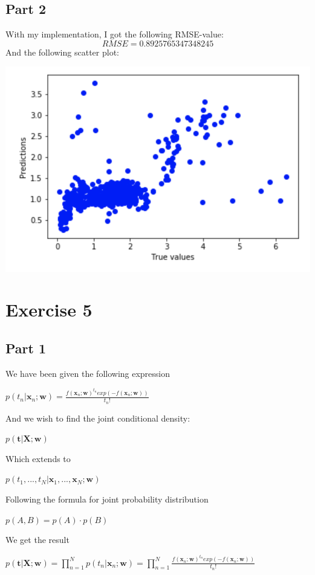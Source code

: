 \documentclass{report}
\begin{document}
\subsection*{Part 2}
With my implementation, I got the following RMSE-value:
$$RMSE = 0.8925765347348245$$
And the following scatter plot:
\begin{center}
    \includegraphics[height = 7 cm]{LinRegNeighbors_scatter.png}
\end{center}

\section*{Exercise 5}
\subsection*{Part 1}
We have been given the following expression
\begin{center}
    \begin{math}
        p(t_n|\bm{x}_n; \bm{w}) = \frac{f(\bm{x}_n; \bm{w})^{t_n}exp(-f(\bm{x}_n; \bm{w}))}{t_n!}
    \end{math}
\end{center}
And we wish to find the joint conditional density:
\begin{center}
    \begin{math}
        p(\bm{t}|\bm{X};\bm{w})
    \end{math}
\end{center}
Which extends to
\begin{center}
    \begin{math}
        p(t_1, ..., t_N | \bm{x}_1, ..., \bm{x}_N; \bm{w})
    \end{math}
\end{center}
Following the formula for joint probability distribution
\begin{center}
    \begin{math}
        p(A, B) = p(A) \cdot p(B)
    \end{math}
\end{center}
We get the result
\begin{center}
    \begin{math}
        p(\bm{t}|\bm{X};\bm{w}) = \displaystyle\prod_{n = 1}^N p(t_n|\bm{x}_n; \bm{w}) = \displaystyle\prod_{n = 1}^N \frac{f(\bm{x}_n; \bm{w})^{t_n}exp(-f(\bm{x}_n; \bm{w}))}{t_n!}
    \end{math}
\end{center}
\end{document}
